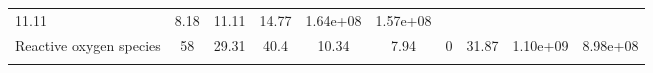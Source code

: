 \documentclass[]{article}
\begin{document}
\begin{longtable}[]{@{}lccccccccc@{}}
\begin{minipage}[t]{0.08\columnwidth}
11.11\strut
\end{minipage} & \begin{minipage}[t]{0.08\columnwidth}\centering\strut
8.18\strut
\end{minipage} & \begin{minipage}[t]{0.08\columnwidth}\centering\strut
11.11\strut
\end{minipage} & \begin{minipage}[t]{0.08\columnwidth}\centering\strut
14.77\strut
\end{minipage} & \begin{minipage}[t]{0.08\columnwidth}\centering\strut
1.64e+08\strut
\end{minipage} & \begin{minipage}[t]{0.08\columnwidth}\centering\strut
1.57e+08\strut
\end{minipage}\tabularnewline
\begin{minipage}[t]{0.07\columnwidth}\raggedright\strut
Reactive oxygen species\strut
\end{minipage} & \begin{minipage}[t]{0.06\columnwidth}\centering\strut
58\strut
\end{minipage} & \begin{minipage}[t]{0.08\columnwidth}\centering\strut
29.31\strut
\end{minipage} & \begin{minipage}[t]{0.08\columnwidth}\centering\strut
40.4\strut
\end{minipage} & \begin{minipage}[t]{0.08\columnwidth}\centering\strut
10.34\strut
\end{minipage} & \begin{minipage}[t]{0.08\columnwidth}\centering\strut
7.94\strut
\end{minipage} & \begin{minipage}[t]{0.08\columnwidth}\centering\strut
0\strut
\end{minipage} & \begin{minipage}[t]{0.08\columnwidth}\centering\strut
31.87\strut
\end{minipage} & \begin{minipage}[t]{0.08\columnwidth}\centering\strut
1.10e+09\strut
\end{minipage} & \begin{minipage}[t]{0.08\columnwidth}\centering\strut
8.98e+08\strut
\end{minipage}\tabularnewline
\begin{minipage}[t]{0.07\columnwidth}\raggedright\strut

\end{minipage}
\end{longtable}
\end{document}
